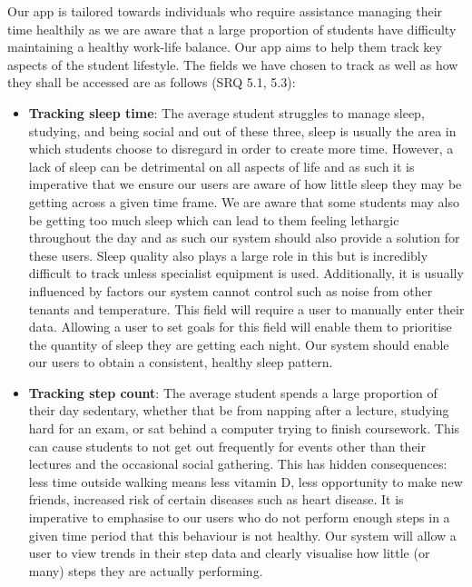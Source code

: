 \documentclass[11pt]{article}
\begin{document}
Our app is tailored towards individuals who require assistance managing their time healthily as
we are aware that a large proportion of students have difficulty maintaining a healthy work-life
balance. Our app aims to help them track key aspects of the student lifestyle.
The fields we have chosen to track as well as how they shall be accessed are as follows (SRQ 5.1, 5.3):

\begin{itemize}

    \item \textbf{Tracking sleep time}: The average student struggles to manage
        sleep, studying, and being social and out of these three, sleep is
        usually the area in which students choose to disregard in order to
        create more time. However, a lack of sleep can be detrimental on all
        aspects of life and as such it is imperative that we ensure our users
        are aware of how little sleep they may be getting across a given time
        frame. We are aware that some students may also be getting too much
        sleep which can lead to them feeling lethargic throughout the day and
        as such our system should also provide a solution for these users.
        Sleep quality also plays a large role in this but is incredibly
        difficult to track unless specialist equipment is used. Additionally,
        it is usually influenced by factors our system cannot control such as
        noise from other tenants and temperature. This field will require a
        user to manually enter their data. Allowing a user to set goals for
        this field will enable them to prioritise the quantity of sleep they
        are getting each night. Our system should enable our users to obtain a
        consistent, healthy sleep pattern.

    \newpage
    
    \item \textbf{Tracking step count}: The average student spends a large
        proportion of their day sedentary, whether that be from napping after a
        lecture, studying hard for an exam, or sat behind a computer trying to
        finish coursework. This can cause students to not get out frequently
        for events other than their lectures and the occasional social
        gathering. This has hidden consequences: less time outside walking
        means less vitamin D, less opportunity to make new friends, increased
        risk of certain diseases such as heart disease. It is imperative to
        emphasise to our users who do not perform enough steps in a given time
        period that this behaviour is not healthy. Our system will allow a user
        to view trends in their step data and clearly visualise how little (or
        many) steps they are actually performing.


\end{itemize}
\end{document}
